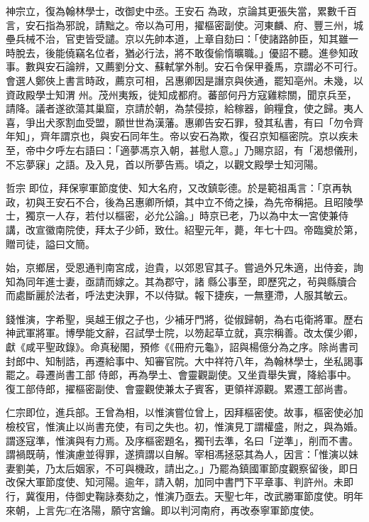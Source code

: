 \begin{pinyinscope}
 神宗立，復為翰林學士，改御史中丞。王安石
 為政，京論其更張失當，累數千百言，安石指為邪說，請黜之。帝以為可用，擢樞密副使。河東麟、府、豐三州，城壘兵械不治，官吏皆受譴。京以先帥本道，上章自劾曰：「使諸路帥臣，知其雖一時脫去，後能僥竊名位者，猶必行法，將不敢復偷惰曠職。」優詔不聽。進參知政事。數與安石論辨，又薦劉分文、蘇軾掌外制。安石令保甲養馬，京謂必不可行。會選人鄭俠上書言時政，薦京可相，呂惠卿因是譖京與俠通，罷知亳州。未幾，以資政殿學士知渭
 州。茂州夷叛，徙知成都府。蕃部何丹方寇雞粽關，聞京兵至，請降。議者遂欲蕩其巢窟，京請於朝，為禁侵掠，給稼器，餉糧食，使之歸。夷人喜，爭出犬豕割血受盟，願世世為漢藩。惠卿告安石罪，發其私書，有曰「勿令齊年知」，齊年謂京也，與安石同年生。帝以安石為欺，復召京知樞密院。京以疾未至，帝中夕呼左右語曰：「適夢馮京入朝，甚慰人意。」乃賜京詔，有「渴想儀刑，不忘夢寐」之語。及入見，首以所夢告焉。頃之，以觀文殿學士知河陽。



 哲宗
 即位，拜保寧軍節度使、知大名府，又改鎮彰德。於是範祖禹言：「京再執政，初與王安石不合，後為呂惠卿所傾，其中立不倚之操，為先帝稱挹。且昭陵學士，獨京一人存，若付以樞密，必允公論。」時京已老，乃以為中太一宮使兼侍講，改宣徽南院使，拜太子少師，致仕。紹聖元年，薨，年七十四。帝臨奠於第，贈司徒，謚曰文簡。



 始，京鄉居，受恩通判南宮成，迨貴，以郊恩官其子。嘗過外兄朱適，出侍妾，詢知為同年進士妻，亟請而嫁之。其為郡守，諸
 縣公事至，即歷究之，茍與縣牘合而處斷麗於法者，呼法吏決罪，不以侍獄。報下捷疾，一無壅滯，人服其敏云。



 錢惟演，字希聖，吳越王俶之子也，少補牙門將，從俶歸朝，為右屯衛將軍。歷右神武軍將軍。博學能文辭，召試學士院，以笏起草立就，真宗稱善。改太僕少卿，獻《咸平聖政錄》。命真秘閣，預修《《冊府元龜》，詔與楊億分為之序。除尚書司封郎中、知制誥，再遷給事中、知審官院。大中祥符八年，為翰林學士，坐私謁事罷之。尋遷尚書工部
 侍郎，再為學土、會靈觀副使。又坐貢舉失實，降給事中。復工部侍郎，擢樞密副使、會靈觀使兼太子賓客，更領祥源觀。累遷工部尚書。



 仁宗即位，進兵部。王曾為相，以惟演嘗位曾上，因拜樞密使。故事，樞密使必加檢校官，惟演止以尚書充使，有司之失也。初，惟演見丁謂權盛，附之，與為婚。謂逐寇準，惟演與有力焉。及序樞密題名，獨刊去準，名曰「逆準」，削而不書。謂禍既萌，惟演慮並得罪，遂擠謂以自解。宰相馮拯惡其為人，因言：「惟演以妹
 妻劉美，乃太后姻家，不可與機政，請出之。」乃罷為鎮國軍節度觀察留後，即日改保大軍節度使、知河陽。逾年，請入朝，加同中書門下平章事、判許州。未即行，冀復用，侍御史鞠詠奏劾之，惟演乃亟去。天聖七年，改武勝軍節度使。明年來朝，上言先□在洛陽，願守宮鑰。即以判河南府，再改泰寧軍節度使。




\end{pinyinscope}
